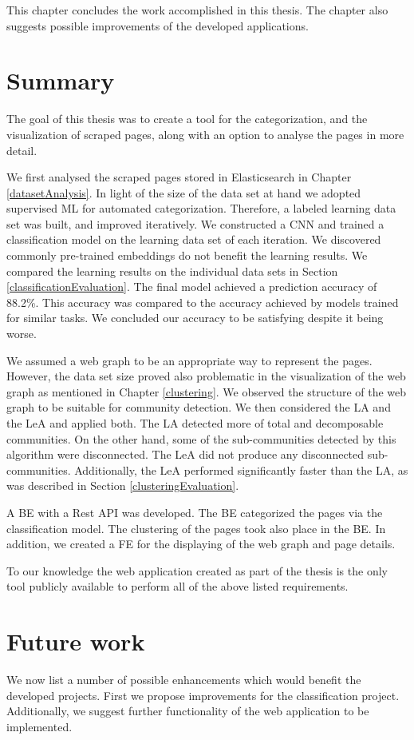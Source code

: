 \label{conclusion}
This chapter concludes the work accomplished in this thesis. The chapter also suggests possible improvements of the developed applications.
\section{Summary}
The goal of this thesis was to create a tool for the categorization, and the visualization of scraped pages, along with an option to analyse the pages in more detail.

We first analysed the scraped pages stored in Elasticsearch in Chapter \ref{datasetAnalysis}. In light of the size of the data set at hand we adopted supervised ML for automated categorization. Therefore, a labeled learning data set was built, and improved iteratively. We constructed a CNN and trained a classification model on the learning data set of each iteration. We discovered commonly pre-trained embeddings do not benefit the learning results. We compared the learning results on the individual data sets in Section \ref{classificationEvaluation}. The final model achieved a prediction accuracy of 88.2\%. This accuracy was compared to the accuracy achieved by models trained for similar tasks. We concluded our accuracy to be satisfying despite it being worse.

 We assumed a web graph to be an appropriate way to represent the pages. However, the data set size proved also problematic in the visualization of the web graph as mentioned in Chapter \ref{clustering}. We observed the structure of the web graph to be suitable for community detection. We then considered the LA and the LeA and applied both. The LA detected more of total and decomposable communities. On the other hand, some of the sub-communities detected by this algorithm were disconnected. The LeA did not produce any disconnected sub-communities. Additionally, the LeA performed significantly faster than the LA, as was described in Section \ref{clusteringEvaluation}.

A BE with a Rest API was developed. The BE categorized the pages via the classification model. The clustering of the pages took also place in the BE. In addition, we created a FE for the displaying of the web graph and page details. 

 To our knowledge the web application created as part of the thesis is the only tool publicly available to perform all of the above listed requirements.

\section{Future work}
We now list a number of possible enhancements which would benefit the developed projects. First we propose improvements for the classification project. Additionally, we suggest further functionality of the web application to be implemented.
